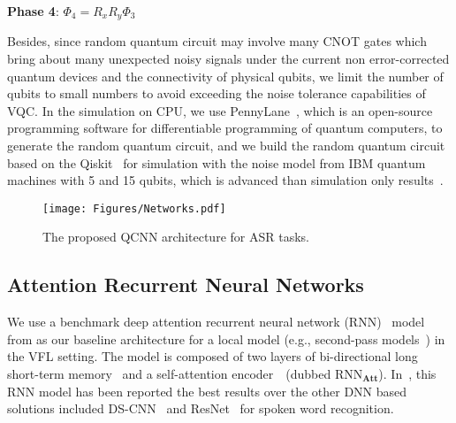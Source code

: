 \documentclass{article}
\begin{document}
\noindent \textbf{Phase 4}:
$\Phi_{4} = R_{x}R_{y}\Phi_{3}$

Besides, since random quantum circuit may involve many CNOT gates which bring about many unexpected noisy signals under the current non error-corrected quantum devices and the connectivity of physical qubits, we limit the number of qubits to small numbers to avoid exceeding the noise tolerance capabilities of VQC. In the simulation on CPU, we use PennyLane~\cite{bergholm2018pennylane}, which is an open-source programming software for differentiable programming of quantum computers, to generate the random quantum circuit, and we build the random quantum circuit based on the Qiskit~\cite{aleksandrowicz2019qiskit} for simulation with the noise model from IBM  quantum machines with 5 and 15 qubits, which is advanced than simulation only results~\cite{henderson2020quanvolutional}.


\begin{figure}[h]
\begin{center}
  \centering    
\texttt{[image: Figures/Networks.pdf]}
\end{center}
\vspace{-0.4cm}
  \caption{The proposed QCNN architecture for ASR tasks.
  } 
\label{fig:3:network}
\vspace{-0.6cm}
\end{figure}

\subsection{Attention Recurrent Neural Networks}
We use a benchmark deep attention recurrent neural network (RNN)~\cite{hochreiter1997long} model from \cite{de2018neural} as our baseline architecture for a local model (e.g., second-pass models~\cite{chen2019federated,yang2020multi}) in the VFL setting. The model is composed of two layers of bi-directional long short-term memory~\cite{hochreiter1997long} and a self-attention encoder~\cite{vaswani2017attention}~(dubbed RNN$_\mathbf{Att}$). In~\cite{de2018neural}, this RNN model has been reported the best results over the other DNN based solutions included DS-CNN~\cite{zhang2017hello} and ResNet~\cite{warden2018speech} for spoken word recognition.
\end{document}
